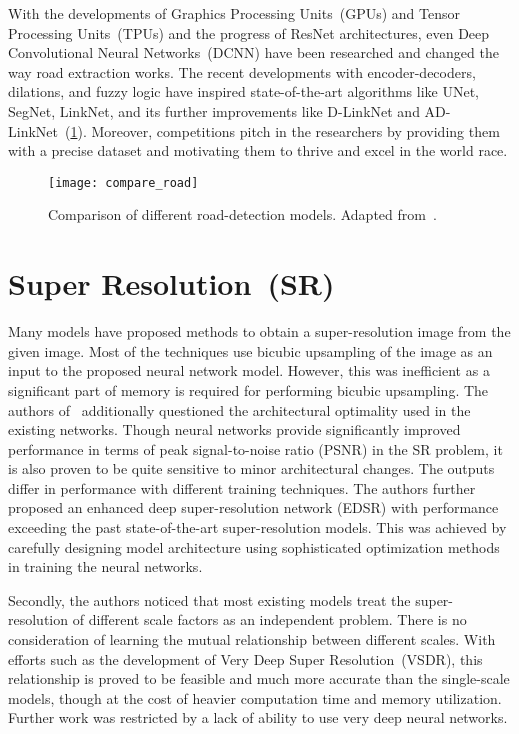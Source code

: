 With the developments of Graphics Processing Units~(GPUs) and Tensor Processing Units~(TPUs) and the progress of ResNet architectures, even Deep Convolutional Neural Networks~(DCNN) have been researched and changed the way road extraction works. The recent developments with encoder-decoders, dilations, and fuzzy logic have inspired state-of-the-art algorithms like UNet, SegNet, LinkNet, and its further improvements like D-LinkNet and AD-LinkNet~(\cref{fig:compare_road}). Moreover, competitions pitch in the researchers by providing them with a precise dataset and motivating them to thrive and excel in the world race.

\begin{figure}[h!]
  \centering
  \texttt{[image: compare\_road]}
  \caption[Comparison of different road-detection models]{Comparison of different road-detection models. Adapted from~\cite{AD-LinkNet}.}
  \label{fig:compare_road}
\end{figure}


\section{Super Resolution~(SR)}\label{sec:sr}
Many models have proposed methods to obtain a super-resolution image from the given image. Most of the techniques use bicubic upsampling of the image as an input to the proposed neural network model. However, this was inefficient as a significant part of memory is required for performing bicubic upsampling. The authors of~\cite{EDSR} additionally questioned the architectural optimality used in the existing networks. Though neural networks provide significantly improved performance in terms of peak signal-to-noise ratio (PSNR) in the SR problem, it is also proven to be quite sensitive to minor architectural changes. The outputs differ in performance with different training techniques. The authors further proposed an enhanced deep super-resolution network (EDSR) with performance exceeding the past state-of-the-art super-resolution models. This was achieved by carefully designing model architecture using sophisticated optimization methods in training the neural networks.

Secondly, the authors noticed that most existing models treat the super-resolution of different scale factors as an independent problem. There is no consideration of learning the mutual relationship between different scales. With efforts such as the development of Very Deep Super Resolution~(VSDR), this relationship is proved to be feasible and much more accurate than the single-scale models, though at the cost of heavier computation time and memory utilization. Further work was restricted by a lack of ability to use very deep neural networks.

